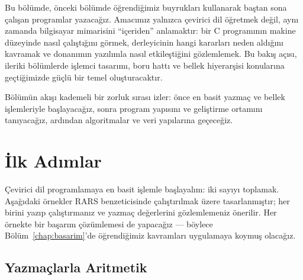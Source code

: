 Bu bölümde, önceki bölümde öğrendiğimiz buyrukları kullanarak baştan sona çalışan programlar yazacağız. Amacımız yalnızca çevirici dil öğretmek değil, aynı zamanda bilgisayar mimarisini ``içeriden'' anlamaktır: bir C programının makine düzeyinde nasıl çalıştığını görmek, derleyicinin hangi kararları neden aldığını kavramak ve donanımın yazılımla nasıl etkileştiğini gözlemlemek. Bu bakış açısı, ileriki bölümlerde işlemci tasarımı, boru hattı ve bellek hiyerarşisi konularına geçtiğimizde güçlü bir temel oluşturacaktır.

Bölümün akışı kademeli bir zorluk sırası izler: önce en basit yazmaç ve bellek işlemleriyle başlayacağız, sonra program yapısını ve geliştirme ortamını tanıyacağız, ardından algoritmalar ve veri yapılarına geçeceğiz.


\section{İlk Adımlar}
\label{sec:ilk-adimlar}

Çevirici dil programlamaya en basit işlemle başlayalım: iki sayıyı toplamak. Aşağıdaki örnekler RARS benzeticisinde çalıştırılmak üzere tasarlanmıştır; her birini yazıp çalıştırmanız ve yazmaç değerlerini gözlemlemeniz önerilir. Her örnekte bir başarım çözümlemesi de yapacağız --- böylece Bölüm~\ref{chap:basarim}'de öğrendiğimiz kavramları uygulamaya koymuş olacağız.

\subsection{Yazmaçlarla Aritmetik}
\label{subsec:yazmaclarla-aritmetik}

